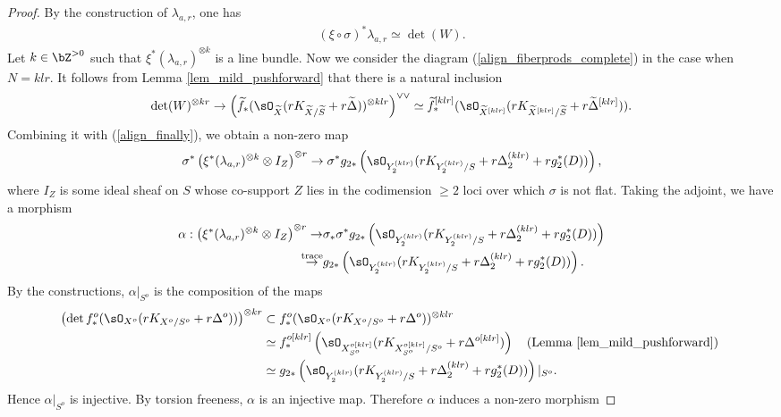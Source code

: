 \documentclass[11pt,letterpaper]{amsart}
\numberwithin{equation}{section}
\begin{document}
\begin{proof}
		By the construction of $\lambda_{a,r}$, one has
		\begin{align*}
			(\xi\circ\sigma)^\ast\lambda_{a,r}\simeq\det(W).
		\end{align*}
		Let $k\in\bZ^{>0}$ such that $\xi^\ast(\lambda_{a,r})^{\otimes k}$ is a line bundle.
		Now we consider the diagram (\ref{align_fiberprods_complete}) in the case when $N=klr$.
		It follows from Lemma \ref{lem_mild_pushforward} that there is a natural inclusion
		\begin{align*}
			\det(W)^{\otimes kr}\to \left(\widetilde{f}_{\ast}(\sO_{\widetilde{X}}(rK_{\widetilde{X}/\widetilde{S}}+r\widetilde{\Delta}))^{\otimes klr}\right)^{\vee\vee}\simeq\widetilde{f}^{[klr]}_{\ast}(\sO_{\widetilde{X}^{[klr]}}(rK_{\widetilde{X}^{[klr]}/\widetilde{S}}+r\widetilde{\Delta}^{[klr]})).
		\end{align*}
		Combining it with (\ref{align_finally}), we obtain a non-zero map
		$$\sigma^\ast\left(\xi^\ast(\lambda_{a,r})^{\otimes k}\otimes I_Z\right)^{\otimes r}\to\sigma^\ast g_{2\ast}\left(\sO_{Y_2^{(klr)}}(rK_{Y_2^{(klr)}/S}+r\Delta_2^{(klr)}+rg_2^{\ast}(D))\right),$$
		where $I_Z$ is some ideal sheaf on $S$ whose co-support $Z$ lies in the codimension $\geq2$ loci over which $\sigma$ is not flat.
		Taking the adjoint, we have a morphism
		\begin{align*}
			\alpha:\left(\xi^\ast(\lambda_{a,r})^{\otimes k}\otimes I_Z\right)^{\otimes r}\to& \sigma_\ast\sigma^\ast g_{2\ast}\left(\sO_{Y_2^{(klr)}}(rK_{Y_2^{(klr)}/S}+r\Delta_2^{(klr)}+rg_2^{\ast}(D))\right)\\\nonumber
			\stackrel{\rm trace}{\to}&g_{2\ast}\left(\sO_{Y_2^{(klr)}}(rK_{Y_2^{(klr)}/S}+r\Delta_2^{(klr)}+rg_2^{\ast}(D))\right).
		\end{align*}
		By the constructions, $\alpha|_{S^o}$ is the composition of the maps
		\begin{align*}
			\left(\det f^o_\ast(\sO_{X^o}(rK_{X^o/S^o}+r\Delta^o))\right)^{\otimes kr}&\subset f^o_\ast(\sO_{X^o}(rK_{X^o/S^o}+r\Delta^o))^{\otimes klr}\\\nonumber
			&\simeq f^{o[klr]}_\ast\left(\sO_{X^{o[klr]}_{S^o}}(rK_{X^{o[klr]}_{S^o}/S^o}+r\Delta^{o[klr]})\right)\quad \textrm{(Lemma \ref{lem_mild_pushforward}) }\\\nonumber
			&\simeq g_{2\ast}\left(\sO_{Y_2^{(klr)}}(rK_{Y_2^{(klr)}/S}+r\Delta_2^{(klr)}+rg_2^{\ast}(D))\right)|_{S^o}.
		\end{align*}
		Hence $\alpha|_{S^o}$ is injective. By torsion freeness, $\alpha$ is an injective map. Therefore $\alpha$ induces a non-zero morphism

\end{proof}
\end{document}

